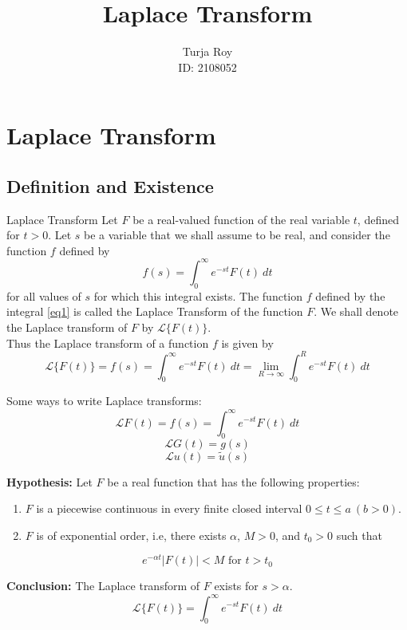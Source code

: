 \documentclass[12pt]{article}
\title{
    \textbf{Laplace Transform}
}
\author{
    Turja Roy\\
    ID: 2108052
}
\date{}
\newcommand{\Lap}{\mathscr{L}}
\begin{document}
\maketitle
\tableofcontents
\newpage


\section{Laplace Transform}


\subsection{Definition and Existence}

\begin{definition}{Laplace Transform}{}
    Let $F$ be a real-valued function of the real variable $t$, defined for $t>0$. Let $s$ be a variable that we shall assume to be real, and consider the function $f$ defined by
    \begin{equation} \label{eq1}
        f(s) = \int_{0}^{\infty} {e^{-st} F(t)} \: d{t} 
    \end{equation}
    for all values of $s$ for which this integral exists. The function $f$ defined by the integral \eqref{eq1} is called the Laplace Transform of the function $F$. We shall denote the Laplace transform of $F$ by $\Lap\{F(t)\}$.\\
    Thus the Laplace transform of a function $f$ is given by
    \begin{equation} \label{eq2}
        \Lap\{ F(t) \} = f(s) = \int_{0}^{\infty} {e^{-st} F(t)} \: d{t}  = \lim_{R \to \infty} \int_{0}^{R} {e^{-st} F(t)} \: d{t} 
    \end{equation}
\end{definition}

Some ways to write Laplace transforms:\\
\[ \Lap{F(t)} = f(s) = \int_{0}^{\infty} { e^{-st} F(t) } \: d{t} \]
\[ \Lap{G(t)} = g(s) \]
\[ \Lap{u(t)} = \tilde{u}(s) \]

\vspace{30pt}
\begin{theorem}{}{}
    \textbf{Hypothesis: } Let $F$ be a real function that has the following properties:
    \begin{enumerate}
        \item $F$ is a piecewise continuous in every finite closed interval $0 \le t \le a \: (b>0)$.
        \item $F$ is of exponential order, i.e, there exists $\alpha$, $M>0$, and $t_0>0$ such that
    \end{enumerate}
    \[ e^{-\alpha t}|F(t)| < M \text{ for } t>t_0 \]
    
    \textbf{Conclusion: } The Laplace transform of $F$ exists for $s>\alpha$.
    \[
        \Lap \{ F(t) \} = \int_{0}^{\infty} {e^{-s t}F(t)} \: d{t}
    \] 
\end{theorem}
\end{document}

